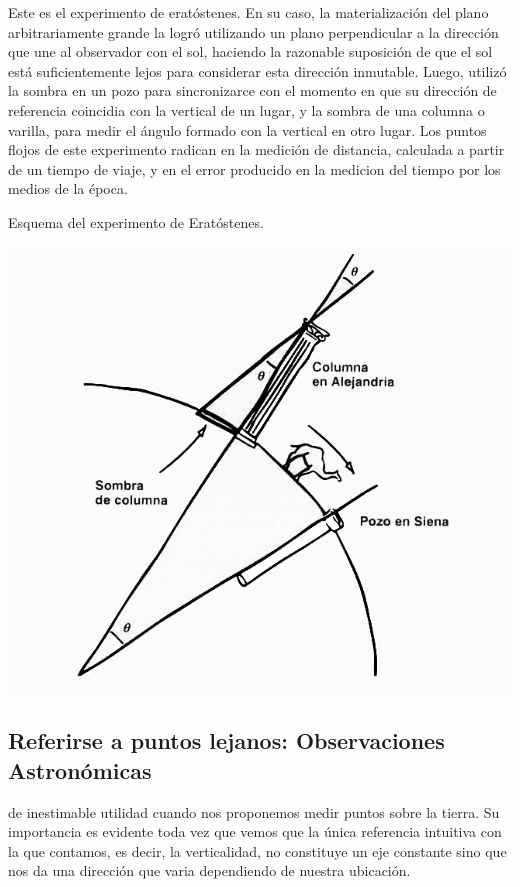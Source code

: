\documentclass{tufte-book}
\begin{document}
Este es el experimento de eratóstenes. En su caso, la materialización del plano arbitrariamente grande
la logró utilizando un plano perpendicular a la dirección que une al observador con el sol, haciendo la
razonable suposición de que el sol está suficientemente lejos para considerar esta dirección inmutable.
Luego, utilizó la sombra en un pozo para sincronizarce con el momento en que su dirección de referencia
coincidia con la vertical de un lugar, y la sombra de una columna o varilla, para medir el ángulo formado
con la vertical en otro lugar. Los puntos flojos de este experimento radican en la medición de distancia,
calculada a partir de un tiempo de viaje, y en el error producido en la medicion del tiempo por los medios
de la época.

\begin{marginfigure}
  \label{fig:eratostenes}
  \caption{Esquema del experimento de Eratóstenes.}
  \includegraphics{./imgs/Eratostenes.png}

\end{marginfigure}

\subsection{Referirse a puntos lejanos: Observaciones Astronómicas}

 de inestimable utilidad cuando nos proponemos
medir puntos sobre la tierra. Su importancia es evidente toda vez que vemos que la única
referencia intuitiva con la que contamos, es decir, la verticalidad, no constituye un eje constante
sino que nos da una dirección que varia dependiendo de nuestra ubicación.
\end{document}
